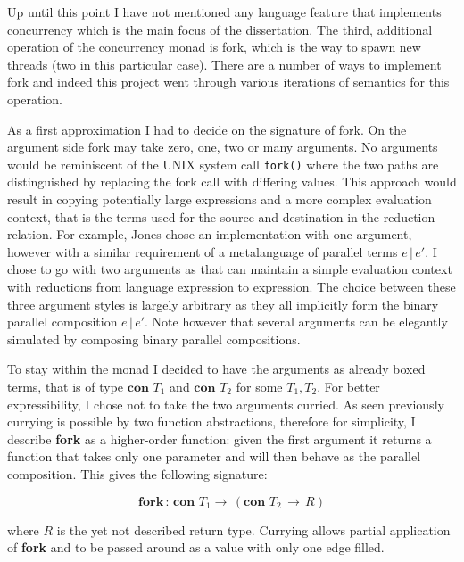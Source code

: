 \documentclass[12pt,twoside,notitlepage]{report}
\theoremstyle{plain}%
\theoremstyle{definition}
\theoremstyle{remark}
\begin{document}
Up until this point I have not mentioned any language feature that implements concurrency which is the main focus of the dissertation. The third, additional operation of the concurrency monad is fork, which is the way to spawn new threads (two in this particular case). There are a number of ways to implement fork and indeed this project went through various iterations of semantics for this operation. 

As a first approximation I had to decide on the signature of fork. On the argument side fork may take zero, one, two or many arguments. No arguments would be reminiscent of the UNIX system call \verb|fork()| where the two paths are distinguished by replacing the fork call with differing values. This approach would result in copying potentially large expressions and a more complex evaluation context, that is the terms used for the source and destination in the reduction relation. For example, Jones\cite{hoareetal2001tackling} chose an implementation with one argument, however with a similar requirement of a metalanguage of parallel terms $ e \, | \, e' $. I chose to go with two arguments as that can maintain a simple evaluation context with reductions from language expression to expression. The choice between these three argument styles is largely arbitrary as they all implicitly form the binary parallel composition $ e \, | \, e' $. Note however that several arguments can be elegantly simulated by composing binary parallel compositions.

To stay within the monad I decided to have the arguments as already boxed terms, that is of type $ \textbf{con } T_1 $ and $ \textbf{con } T_2 $ for some $ T_1, T_2 $. For better expressibility, I chose not to take the two arguments curried. As seen previously currying is possible by two function abstractions, therefore for simplicity, I describe  \textbf{fork} as a higher-order function: given the first argument it returns a function that takes only one parameter and will then behave as the parallel composition. This gives the following signature:

\[ \textbf{fork} \, : \, \textbf{con } T_1 \rightarrow \, (\textbf{con } T_2\, \rightarrow\, R ) \tag{T-Fork1} \]  

where $ R $ is the yet not described return type. Currying allows partial application of \textbf{fork} and to be passed around as a value with only one edge filled. 
\end{document}
